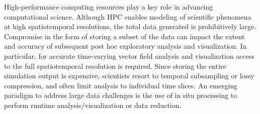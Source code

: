 %
%
%
%
High-performance computing resources play a key role in advancing computational science.
%
Although HPC enables modeling of scientific phenomena at high spatiotemporal resolutions, the total data generated is prohibitively large.
%
Compromise in the form of storing a subset of the data can impact the extent and accuracy of subsequent post hoc exploratory analysis and visualization.
%
In particular, for accurate time-varying vector field analysis and visualization access to the full spatiotemporal resolution is required.
%
Since storing the entire simulation output is expensive, scientists resort to temporal subsampling or lossy compression, and often limit analysis to individual time slices.
%
An emerging paradigm to address large data challenges is the use of in situ processing to perform runtime analysis/visualization or data reduction.
%
%

